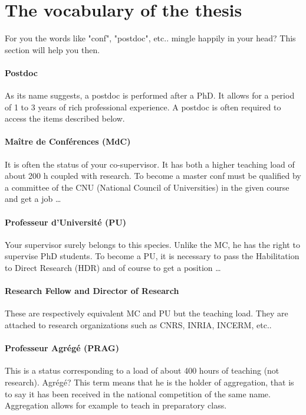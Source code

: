 \section{The vocabulary of the thesis}
For you the words like "conf", "postdoc", etc.. mingle happily in your head?
This section will help you then.
\paragraph {Postdoc}
As its name suggests, a postdoc is performed after a PhD.
It allows for a period of 1 to 3 years of rich professional experience.
A postdoc is often required to access the items described below.
\paragraph {Maître de Conférences (MdC)}
It is often the status of your co-supervisor.
It has both a higher teaching load of about 200 h coupled with research.
To become a master conf must be qualified by a committee of the CNU (National Council of Universities) in the given course and get a job \dots
\paragraph{Professeur d'Université (PU)}
Your supervisor surely belongs to this species.
Unlike the MC, he has the right to supervise PhD students.
To become a PU, it is necessary to pass the Habilitation to Direct Research (HDR) and of course to get a position \dots
\paragraph{Research Fellow and Director of Research}
These are respectively equivalent MC and PU but the teaching load.
They are attached to research organizations such as CNRS, INRIA, INCERM, etc..
\paragraph{Professeur Agrégé (PRAG)} This is a status corresponding to a load of about 400 hours of teaching (not research).
Agrégé? This term means that he is the holder of aggregation, that is to say it has been received in the national competition of the same name.
Aggregation allows for example to teach in preparatory class.

